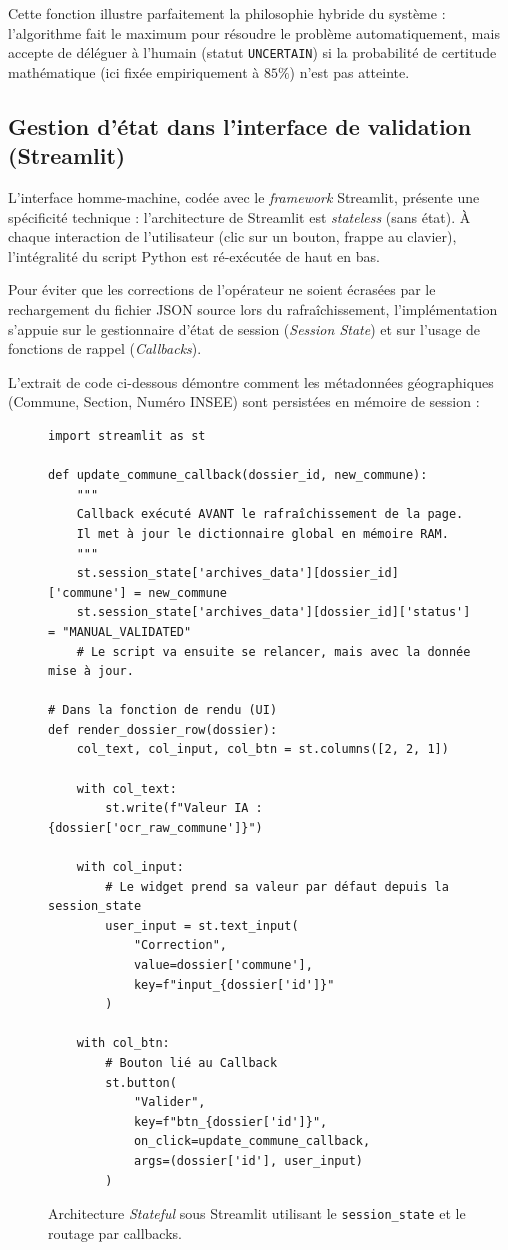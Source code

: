 Cette fonction illustre parfaitement la philosophie hybride du système : l'algorithme fait le maximum pour résoudre le problème automatiquement, mais accepte de déléguer à l'humain (statut \texttt{UNCERTAIN}) si la probabilité de certitude mathématique (ici fixée empiriquement à $85\%$) n'est pas atteinte.

\subsection{Gestion d'état dans l'interface de validation (Streamlit)}

L'interface homme-machine, codée avec le \textit{framework} Streamlit, présente une spécificité technique : l'architecture de Streamlit est \textit{stateless} (sans état). À chaque interaction de l'utilisateur (clic sur un bouton, frappe au clavier), l'intégralité du script Python est ré-exécutée de haut en bas. 

Pour éviter que les corrections de l'opérateur ne soient écrasées par le rechargement du fichier JSON source lors du rafraîchissement, l'implémentation s'appuie sur le gestionnaire d'état de session (\textit{Session State}) et sur l'usage de fonctions de rappel (\textit{Callbacks}).

L'extrait de code ci-dessous démontre comment les métadonnées géographiques (Commune, Section, Numéro INSEE) sont persistées en mémoire de session :

\begin{figure}[H]
\begin{verbatim}
import streamlit as st

def update_commune_callback(dossier_id, new_commune):
    """
    Callback exécuté AVANT le rafraîchissement de la page.
    Il met à jour le dictionnaire global en mémoire RAM.
    """
    st.session_state['archives_data'][dossier_id]['commune'] = new_commune
    st.session_state['archives_data'][dossier_id]['status'] = "MANUAL_VALIDATED"
    # Le script va ensuite se relancer, mais avec la donnée mise à jour.

# Dans la fonction de rendu (UI)
def render_dossier_row(dossier):
    col_text, col_input, col_btn = st.columns([2, 2, 1])
    
    with col_text:
        st.write(f"Valeur IA : {dossier['ocr_raw_commune']}")
        
    with col_input:
        # Le widget prend sa valeur par défaut depuis la session_state
        user_input = st.text_input(
            "Correction", 
            value=dossier['commune'],
            key=f"input_{dossier['id']}"
        )
        
    with col_btn:
        # Bouton lié au Callback
        st.button(
            "Valider",
            key=f"btn_{dossier['id']}",
            on_click=update_commune_callback,
            args=(dossier['id'], user_input)
        )
\end{verbatim}
\caption{Architecture \textit{Stateful} sous Streamlit utilisant le \texttt{session\_state} et le routage par callbacks.}
\end{figure}


